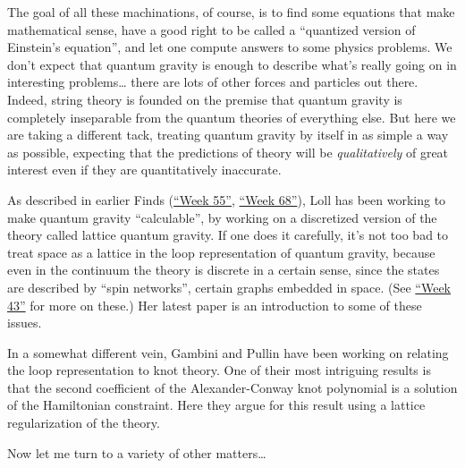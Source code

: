 \documentclass{article}
\renewcommand{\texttt}[1]{%
  \begingroup
  \ttfamily
  \begingroup\lccode`~=`/\lowercase{\endgroup\def~}{/\discretionary{}{}{}}%
  \begingroup\lccode`~=`[\lowercase{\endgroup\def~}{[\discretionary{}{}{}}%
  \begingroup\lccode`~=`.\lowercase{\endgroup\def~}{.\discretionary{}{}{}}%
  \catcode`/=\active\catcode`[=\active\catcode`.=\active
  \scantokens{#1\noexpand}%
  \endgroup
}
\begin{document}
The goal of all these machinations, of course, is to find some equations
that make mathematical sense, have a good right to be called a
``quantized version of Einstein's equation'', and let one compute
answers to some physics problems. We don't expect that quantum gravity
is enough to describe what's really going on in interesting
problems\ldots{} there are lots of other forces and particles out there.
Indeed, string theory is founded on the premise that quantum gravity is
completely inseparable from the quantum theories of everything else. But
here we are taking a different tack, treating quantum gravity by itself
in as simple a way as possible, expecting that the predictions of theory
will be \emph{qualitatively} of great interest even if they are
quantitatively inaccurate.

As described in earlier Finds (\protect\hyperlink{week55}{``Week 55''},
\protect\hyperlink{week68}{``Week 68''}), Loll has been working to make
quantum gravity ``calculable'', by working on a discretized version of
the theory called lattice quantum gravity. If one does it carefully,
it's not too bad to treat space as a lattice in the loop representation
of quantum gravity, because even in the continuum the theory is discrete
in a certain sense, since the states are described by ``spin networks'',
certain graphs embedded in space. (See \protect\hyperlink{week43}{``Week
43''} for more on these.) Her latest paper is an introduction to some of
these issues.

In a somewhat different vein, Gambini and Pullin have been working on
relating the loop representation to knot theory. One of their most
intriguing results is that the second coefficient of the
Alexander-Conway knot polynomial is a solution of the Hamiltonian
constraint. Here they argue for this result using a lattice
regularization of the theory.

Now let me turn to a variety of other matters\ldots{}

\end{document}
